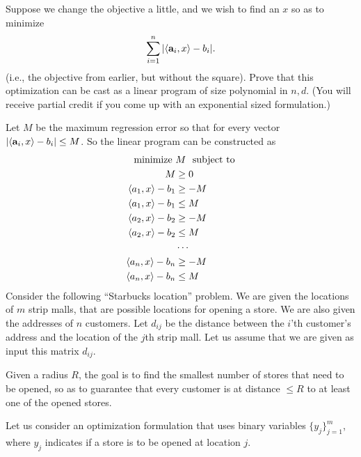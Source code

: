 \documentclass[addpoints]{exam}
\begin{document}
\begin{questions}
Suppose we change the objective a little, and we wish to find an $x$ so as to minimize
\[ \sum_{i=1}^n | \langle \mathbf{a}_i, x \rangle - b_i|. \]
(i.e., the objective from earlier, but without the square).  Prove that this optimization can be cast as a linear program of size polynomial in $n, d$.  (You will receive partial credit if you come up with an exponential sized formulation.)

Let $M$ be the maximum regression error so that for every vector $|\langle \mathbf{a}_i, x \rangle - b_i| \leq M$. So the linear program can be constructed as
\begin{align*}
\text{minimize } &M ~~\text{subject to} \\
M &\geq 0\\
\langle a_1, x \rangle -b_1 &\ge -M \\
\langle a_1, x \rangle -b_1 &\le M \\
\langle a_2, x \rangle -b_2 &\ge -M \\
\langle a_2, x \rangle -b_2 &\le M \\
&\cdots \\
\langle a_n, x \rangle -b_n &\ge -M \\
\langle a_n, x \rangle -b_n &\le M \\
\end{align*}
Consider the following ``Starbucks location'' problem. We are given the locations of $m$ strip malls, that are possible locations for opening a store.  We are also given the addresses of $n$ customers.  Let $d_{ij}$ be the distance between the $i$'th customer's address and the location of the $j$th strip mall. Let us assume that we are given as input this matrix $d_{ij}$.

Given a radius $R$, the goal is to find the smallest number of stores that need to be opened, so as to guarantee that every customer is at distance $\le R$ to at least one of the opened stores.

Let us consider an optimization formulation that uses binary variables $\{y_j\}_{j = 1}^m$, where $y_j$ indicates if a store is to be opened at location $j$.
\end{questions}
\end{document}
